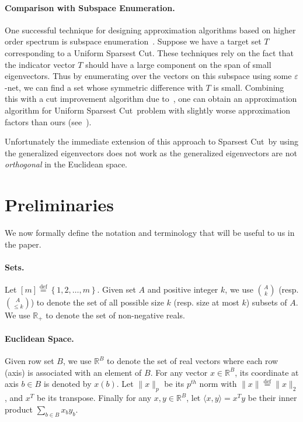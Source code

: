 \documentclass{article}
\def\triangleq{\overset{\mathrm{def}}{=}}
\let\eps=\varepsilon
\newcommand{\R}{\mathbb{R}}
\newcommand{\xvec}{\vec{x}} \newcommand{\yvec}{\vec{y}} \newcommand{\xmat}{\vec{X}} \newcommand{\ymat}{\vec{Y}} \newcommand{\zmat}{\vec{Z}}
\newcommand{\usc}{\textsc{\sf Uniform Sparsest Cut}}
\newcommand{\nusc}{\textsc{\sf Non-Uniform Sparsest Cut}}
\newcounter{alg-count}
\def\ngap{}
\def\vec{}
\renewcommand{\nusc}{{\sc Sparsest Cut}}
\renewcommand{\usc}{{\sc Uniform Sparsest Cut}}
\begin{document}
\paragraph{Comparison with Subspace Enumeration.} 
One successful technique for designing approximation algorithms based
on higher order spectrum is subspace enumeration~\cite{kolla10,ABS}.
Suppose we have a target set $T$ corresponding to a \usc.  These
techniques rely on the fact that the indicator vector $T$ should have
a large component on the span of small eigenvectors. Thus by
enumerating over the vectors on this subspace using some $\eps$-net,
we can find a set whose symmetric difference with $T$ is
small. Combining this with a cut improvement algorithm due
to~\cite{al08}, one can obtain an approximation algorithm for \usc\
problem with slightly worse approximation factors than ours
(see~).

Unfortunately the immediate extension of this approach to \nusc\ by
using the generalized eigenvectors does not work as the generalized
eigenvectors are not {\em orthogonal} in the Euclidean space.
\ngap
\section{Preliminaries}
\label{sec:prelim}
We now formally define the notation and terminology that will be
useful to us in the paper.

\paragraph{Sets.} Let $[m]\triangleq \left\{1,2,\ldots,
  m\right\}$. Given set $A$ and positive integer $k$, we use
$\binom{A}{k}$ (resp. $\binom{A}{\le k}$) to denote the set of all
possible size $k$ (resp. size at most $k$) subsets of $A$.  We use
$\R_+$ to denote the set of non-negative reals.

\paragraph{Euclidean Space.} Given row set $B$, we use $\R^B$ to
denote the set of real vectors where each row (axis) is associated
with an element of $B$.
For any vector $\xvec \in \R^B$, its coordinate at axis $b \in B$ is
denoted by $\xvec(b)$.  Let $\|\xvec\|_p$ be its $p^{th}$ norm with
$\|\xvec\|\triangleq \|\xvec\|_2$, and $\xvec^T$ be its transpose.
Finally for any $\xvec, \yvec\in \R^B$, let $\langle \xvec,
\yvec\rangle = \xvec^T \yvec$ be their inner product $\sum_{b\in B}
\xvec_b \yvec_b$.
 
\end{document}
